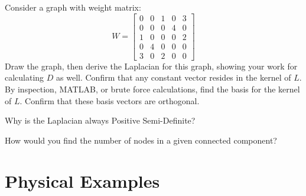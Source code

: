 \begin{exercise}
Consider a graph with weight matrix:
\[
W = 
\begin{bmatrix}
    0 & 0 & 1 & 0 & 3\\
    0 & 0 & 0 & 4 & 0\\
    1 & 0 & 0 & 0 & 2\\
    0 & 4 & 0 & 0 & 0\\
    3 & 0 & 2 & 0 & 0
\end{bmatrix}
\]
Draw the graph, then derive the Laplacian for this graph, showing your
work for calculating \(D\) as well. Confirm that any constant vector
resides in the kernel of \(L\). By inspection, MATLAB, or brute force
calculations, find the basis for the kernel of \(L\). Confirm that
these basis vectors are orthogonal. 
\end{exercise}
\begin{exercise} Why is the Laplacian always
  Positive Semi-Definite? 
\end{exercise}
\begin{exercise}
How would you find the number of nodes in a given connected component?
\end{exercise}

\section{Physical Examples}
